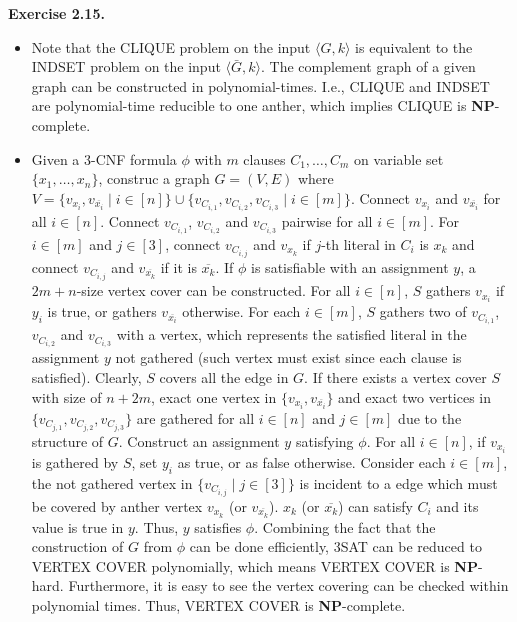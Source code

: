\documentclass[a4paper]{article}
\newenvironment{exercise}[1]{
	\par
	\noindent\textbf{Exercise #1.}\quad
}{
	\par
	\bigskip
}
\begin{document}
	
	\begin{exercise}{2.15}
		\begin{itemize}
			\item Note that the \textsf{CLIQUE} problem on the input $\langle G,k\rangle$ is equivalent to the \textsf{INDSET} problem on the input $\langle \bar G, k\rangle$. The complement graph of a given graph can be constructed in polynomial-times. I.e., \textsf{CLIQUE} and \textsf{INDSET} are polynomial-time reducible to one anther, which implies \textsf{CLIQUE} is \textbf{NP}-complete.

			\item Given a 3-CNF formula $\phi$ with $m$ clauses $C_1, \ldots, C_m$ on variable set $\{x_1,\ldots,x_n\}$, construc a graph $G = (V,E)$ where $V = \{v_{x_i}, v_{\overline{x_i}} \mid i \in [n]\} \cup \{v_{C_{i,1}}, v_{C_{i,2}}, v_{C_{i,3}} \mid i\in [m]\}$. Connect $v_{x_i}$ and $v_{\overline{x_i}}$ for all $i\in [n]$. Connect $v_{C_{i,1}}$, $v_{C_{i,2}}$ and $v_{C_{i,3}}$ pairwise for all $i \in [m]$. For $i \in [m]$ and $j \in [3]$, connect $v_{C_{i,j}}$ and $v_{x_k}$ if $j$-th literal in $C_i$ is $x_k$ and connect $v_{C_{i,j}}$ and $v_{\overline{x_k}}$ if it is $\overline{x_k}$. If $\phi$ is satisfiable with an assignment $y$, a $2m+n$-size vertex cover can be constructed. For all $i\in [n]$, $S$ gathers $v_{x_i}$ if $y_i$ is true, or gathers $v_{\overline{x_i}}$ otherwise. For each $i \in [m]$, $S$ gathers two of $v_{C_{i,1}}$, $v_{C_{i,2}}$ and $v_{C_{i,3}}$ with a vertex, which represents the satisfied literal in the assignment $y$ not gathered (such vertex must exist since each clause is satisfied). Clearly, $S$ covers all the edge in $G$. If there exists a vertex cover $S$ with size of $n+2m$, exact one vertex in $\{v_{x_i}, v_{\overline{x_i}}\}$ and exact two vertices in $\{v_{C_{j,1}}, v_{C_{j,2}}, v_{C_{j,3}}\}$ are gathered for all $i \in [n]$ and $j\in [m]$ due to the structure of $G$. Construct an assignment $y$ satisfying $\phi$. For all $i\in [n]$, if $v_{x_i}$ is gathered by $S$, set $y_i$ as true, or as false otherwise. Consider each $i\in [m]$, the not gathered vertex in $\{v_{C_{i,j}}\mid j\in [3]\}$ is incident to a edge which must be covered by anther vertex $v_{x_k}$ (or $v_{\overline{x_k}}$). $x_k$ (or $\overline{x_k}$) can satisfy $C_i$ and its value is true in $y$. Thus, $y$ satisfies $\phi$. Combining the fact that the construction of $G$ from $\phi$ can be done efficiently, \textsf{3SAT} can be reduced to \textsf{VERTEX COVER} polynomially, which means \textsf{VERTEX COVER} is \textbf{NP}-hard. Furthermore, it is easy to see the vertex covering can be checked within polynomial times. Thus, \textsf{VERTEX COVER} is \textbf{NP}-complete.		
		\end{itemize}
	\end{exercise}
\end{document}
